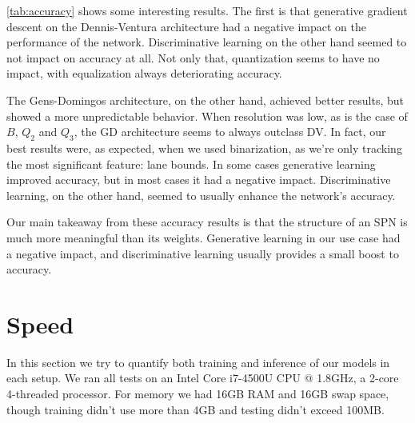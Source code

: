 \autoref{tab:accuracy} shows some interesting results. The first is that generative gradient
descent on the Dennis-Ventura architecture had a negative impact on the performance of
the network. Discriminative learning on the other hand seemed to not impact on accuracy at all. Not
only that, quantization seems to have no impact, with equalization always deteriorating accuracy.

The Gens-Domingos architecture, on the other hand, achieved better results, but showed a more
unpredictable behavior. When resolution was low, as is the case of $B$, $Q_2$ and $Q_3$, the GD
architecture seems to always outclass DV. In fact, our best results were, as expected, when we used
binarization, as we're only tracking the most significant feature: lane bounds. In some cases
generative learning improved accuracy, but in most cases it had a negative impact.  Discriminative
learning, on the other hand, seemed to usually enhance the network's accuracy.

Our main takeaway from these accuracy results is that the structure of an SPN is much more
meaningful than its weights. Generative learning in our use case had a negative impact, and
discriminative learning usually provides a small boost to accuracy.

\section{Speed}

In this section we try to quantify both training and inference of our models in each setup. We ran
all tests on an Intel Core i7-4500U CPU @ 1.8GHz, a 2-core 4-threaded processor. For memory we had
16GB RAM and 16GB swap space, though training didn't use more than 4GB and testing didn't exceed
100MB.

